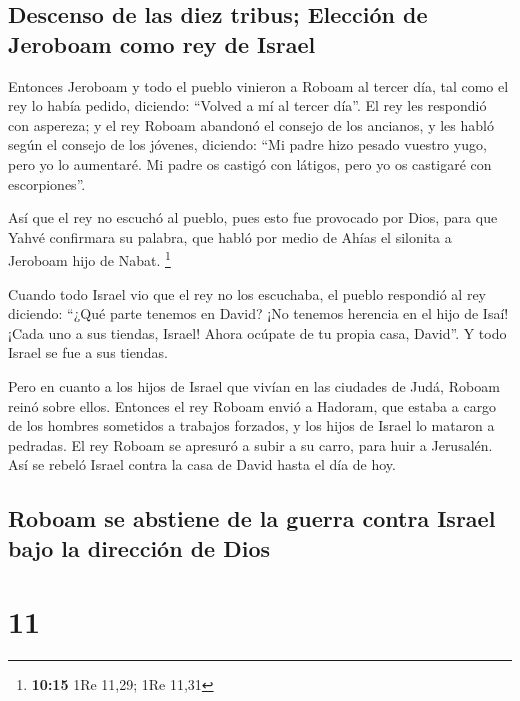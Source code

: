 \hypertarget{descenso-de-las-diez-tribus-elecciuxf3n-de-jeroboam-como-rey-de-israel}{%
\subsection{Descenso de las diez tribus; Elección de Jeroboam como rey
de
Israel}\label{descenso-de-las-diez-tribus-elecciuxf3n-de-jeroboam-como-rey-de-israel}}

 Entonces Jeroboam y todo el pueblo vinieron a Roboam al
tercer día, tal como el rey lo había pedido, diciendo: ``Volved a mí al
tercer día''.  El rey les respondió con aspereza; y el
rey Roboam abandonó el consejo de los ancianos,  y les
habló según el consejo de los jóvenes, diciendo: ``Mi padre hizo pesado
vuestro yugo, pero yo lo aumentaré. Mi padre os castigó con látigos,
pero yo os castigaré con escorpiones''.

 Así que el rey no escuchó al pueblo, pues esto fue
provocado por Dios, para que Yahvé confirmara su palabra, que habló por
medio de Ahías el silonita a Jeroboam hijo de Nabat. \footnote{\textbf{10:15}
  1Re 11,29; 1Re 11,31}

 Cuando todo Israel vio que el rey no los escuchaba, el
pueblo respondió al rey diciendo: ``¿Qué parte tenemos en David? ¡No
tenemos herencia en el hijo de Isaí! ¡Cada uno a sus tiendas, Israel!
Ahora ocúpate de tu propia casa, David''. Y todo Israel se fue a sus
tiendas.

 Pero en cuanto a los hijos de Israel que vivían en las
ciudades de Judá, Roboam reinó sobre ellos.  Entonces el
rey Roboam envió a Hadoram, que estaba a cargo de los hombres sometidos
a trabajos forzados, y los hijos de Israel lo mataron a pedradas. El rey
Roboam se apresuró a subir a su carro, para huir a Jerusalén.
 Así se rebeló Israel contra la casa de David hasta el
día de hoy.

\hypertarget{roboam-se-abstiene-de-la-guerra-contra-israel-bajo-la-direcciuxf3n-de-dios}{%
\subsection{Roboam se abstiene de la guerra contra Israel bajo la
dirección de
Dios}\label{roboam-se-abstiene-de-la-guerra-contra-israel-bajo-la-direcciuxf3n-de-dios}}

\hypertarget{section-10}{%
\section{11}\label{section-10}}

